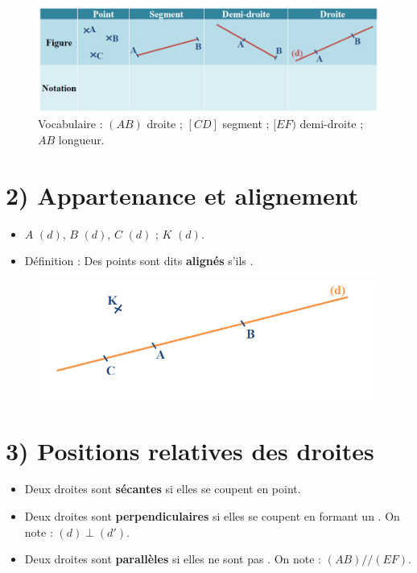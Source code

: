 \begin{figure}[h]
	\centering
	\includegraphics[width=1\linewidth]{../../../assets/images/6e/seq_02/points_segment_droites.png}
	\caption{Vocabulaire : $(AB)$ droite ; $[CD]$ segment ; $[EF)$ demi-droite ; $AB$ longueur.}
	\label{fig:vocab-points-droites}
\end{figure}

\section*{2) Appartenance et alignement}
\begin{itemize}[label = \textbullet]
	\item $A$ \trou{1cm} $(d)$, $B$ \trou{1cm} $(d)$, $C$ \trou{1cm} $(d)$ ; $K$ \trou{1cm} $(d)$.
	\item Définition : Des points sont dits \textbf{alignés} s'ils \trou{6cm}.
\end{itemize}

\begin{figure}[h]
	\centering
	\includegraphics[width=1\linewidth]{../../../assets/images/6e/seq_02/pt_sur_dte.png}

	\label{fig:point-sur-droite}
\end{figure}

\section*{3) Positions relatives des droites}
\begin{itemize}
	\item Deux droites sont \textbf{sécantes} si elles se coupent en \trou{1.2cm} point.
	\item Deux droites sont \textbf{perpendiculaires} si elles se coupent en formant un \trou{1.5cm} \trou{1.5cm}. On note : $(d)\perp(d')$.
	\item Deux droites sont \textbf{parallèles} si elles ne sont pas \trou{2.2cm}. On note : $(AB)//(EF)$.
\end{itemize}

